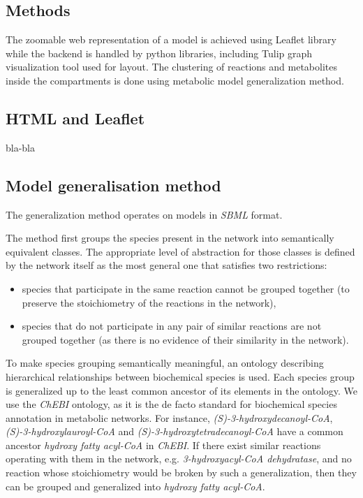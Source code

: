 \documentclass{bioinfo}
\begin{document}
\begin{methods}
\section{Methods}

The zoomable web representation of a model is achieved using Leaflet library while the backend is handled by python libraries, including Tulip graph visualization tool used for layout. The clustering of reactions and metabolites inside the compartments is done using metabolic model generalization method.

\subsection*{HTML and Leaflet}

bla-bla


\subsection*{Model generalisation method}
The generalization method\cite{Zhukova2014} operates on models in \textit{SBML}\cite{Hucka08} format.

\label{restrictions}
The method first groups the species present in the network into semantically equivalent classes. The appropriate level of abstraction for those classes is defined by the network itself as the most general one that satisfies two restrictions: 
\begin{itemize}
 \item species that participate in the same reaction cannot be grouped together (to preserve the stoichiometry of the reactions in the network),
 \item species that do not participate in any pair of similar reactions are not grouped together (as there is no evidence of their similarity in the network).
\end{itemize}
To make species grouping semantically meaningful, an ontology describing hierarchical relationships between biochemical species is used. Each species group is generalized up to the least common ancestor of its elements in the ontology. We use the \textit{ChEBI} ontology, as it is the de facto standard for biochemical species annotation in metabolic networks. %
For instance, \textit{(S)-3-hydroxydecanoyl-CoA}, \textit{(S)-3-hydroxylauroyl-CoA} and \textit{(S)-3-hydroxytetradecanoyl-CoA} have a common ancestor \textit{hydroxy fatty acyl-CoA} in \textit{ChEBI}. If there exist similar reactions operating with them in the network, e.g. \textit{3-hydroxyacyl-CoA dehydratase}, and no reaction whose stoichiometry would be broken by such a generalization, then they can be grouped and generalized into \textit{hydroxy fatty acyl-CoA}.


\end{methods}
\end{document}

